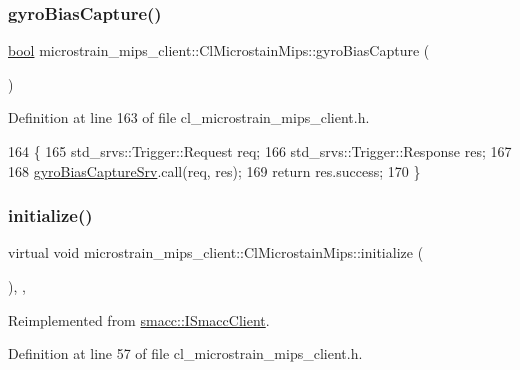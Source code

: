\subsubsection{\texorpdfstring{gyro\+Bias\+Capture()}{gyroBiasCapture()}}
{\footnotesize\ttfamily \hyperlink{classbool}{bool} microstrain\+\_\+mips\+\_\+client\+::\+Cl\+Microstain\+Mips\+::gyro\+Bias\+Capture (\begin{DoxyParamCaption}{ }\end{DoxyParamCaption})\hspace{0.3cm}{\ttfamily [inline]}}



Definition at line 163 of file cl\+\_\+microstrain\+\_\+mips\+\_\+client.\+h.


\begin{DoxyCode}
164     \{
165         std\_srvs::Trigger::Request req;
166         std\_srvs::Trigger::Response res;
167 
168         \hyperlink{classmicrostrain__mips__client_1_1ClMicrostainMips_a34e61956b27bf1b5537a4afea441d30f}{gyroBiasCaptureSrv}.call(req, res);
169         \textcolor{keywordflow}{return} res.success;
170     \}
\end{DoxyCode}
\mbox{\label{classmicrostrain__mips__client_1_1ClMicrostainMips_ae0adc1622c1d6ca2da4ea7fe03604208}} 
\subsubsection{\texorpdfstring{initialize()}{initialize()}}
{\footnotesize\ttfamily virtual void microstrain\+\_\+mips\+\_\+client\+::\+Cl\+Microstain\+Mips\+::initialize (\begin{DoxyParamCaption}{ }\end{DoxyParamCaption})\hspace{0.3cm}{\ttfamily [inline]}, {\ttfamily [override]}, {\ttfamily [virtual]}}



Reimplemented from \hyperlink{classsmacc_1_1ISmaccClient_a974ebb6ad6cf812e7b9de6b78b3d901f}{smacc\+::\+I\+Smacc\+Client}.



Definition at line 57 of file cl\+\_\+microstrain\+\_\+mips\+\_\+client.\+h.


